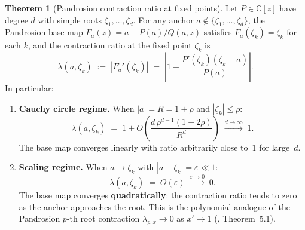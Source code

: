 \documentclass[11pt,a4paper]{article}
\theoremstyle{definition}
\newtheorem{theorem}{Theorem}[section]
\newcommand{\CC}{\mathbb{C}}
\begin{document}
\begin{theorem}[Pandrosion contraction ratio at fixed points]
\label{thm:contraction_ratio}
Let $P \in \CC[z]$ have degree $d$ with simple roots $\zeta_1, \ldots, \zeta_d$.  For any anchor $a \notin \{\zeta_1,\ldots,\zeta_d\}$, the Pandrosion base map $F_a(z) = a - P(a)/Q(a,z)$ satisfies $F_a(\zeta_k) = \zeta_k$ for each $k$, and the contraction ratio at the fixed point $\zeta_k$ is
\begin{equation}
  \label{eq:contraction_ratio}
  \lambda(a,\zeta_k) \;:=\; |F_a'(\zeta_k)| \;=\; \left|1 + \frac{P'(\zeta_k)(\zeta_k - a)}{P(a)}\right|.
\end{equation}
In particular:
\begin{enumerate}
  \item[\textup{(i)}] \textbf{Cauchy circle regime.}  When $|a| = R = 1+\rho$ and $|\zeta_k| \leq \rho$:
  \[
    \lambda(a,\zeta_k) \;=\; 1 + O\!\left(\frac{d\,\rho^{d-1}(1+2\rho)}{R^d}\right) \;\xrightarrow{d\to\infty}\; 1.
  \]
  The base map converges linearly with ratio arbitrarily close to~$1$ for large~$d$.
  \item[\textup{(ii)}] \textbf{Scaling regime.}  When $a \to \zeta_k$ with $|a - \zeta_k| = \varepsilon \ll 1$:
  \[
    \lambda(a,\zeta_k) \;=\; O(\varepsilon) \;\xrightarrow{\varepsilon\to 0}\; 0.
  \]
  The base map converges \textbf{quadratically}: the contraction ratio tends to zero as the anchor approaches the root.  This is the polynomial analogue of the Pandrosion $p$-th root contraction $\lambda_{p,x} \to 0$ as $x' \to 1$ (\cite{besevic2026}, Theorem~5.1).
\end{enumerate}
\end{theorem}
\end{document}
